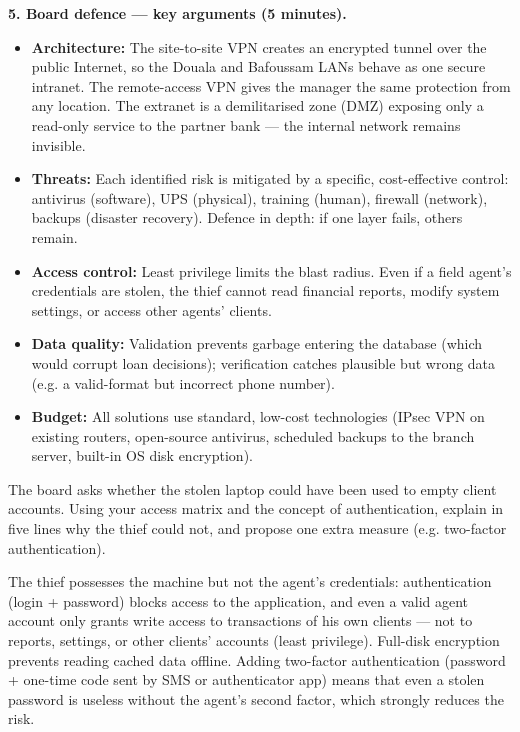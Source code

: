 \documentclass[11pt]{article}
\begin{document}
\textbf{5. Board defence — key arguments (5 minutes).}

\begin{itemize}
\item \textbf{Architecture:} The site-to-site VPN creates an encrypted tunnel over the public Internet, so the Douala and Bafoussam LANs behave as one secure intranet. The remote-access VPN gives the manager the same protection from any location. The extranet is a demilitarised zone (DMZ) exposing only a read-only service to the partner bank — the internal network remains invisible.
\item \textbf{Threats:} Each identified risk is mitigated by a specific, cost-effective control: antivirus (software), UPS (physical), training (human), firewall (network), backups (disaster recovery). Defence in depth: if one layer fails, others remain.
\item \textbf{Access control:} Least privilege limits the blast radius. Even if a field agent's credentials are stolen, the thief cannot read financial reports, modify system settings, or access other agents' clients.
\item \textbf{Data quality:} Validation prevents garbage entering the database (which would corrupt loan decisions); verification catches plausible but wrong data (e.g. a valid-format but incorrect phone number).
\item \textbf{Budget:} All solutions use standard, low-cost technologies (IPsec VPN on existing routers, open-source antivirus, scheduled backups to the branch server, built-in OS disk encryption).
\end{itemize}

\begin{exercice}[Extension]
The board asks whether the stolen laptop could have been used to empty client accounts. Using your access matrix and the concept of authentication, explain in five lines why the thief could not, and propose one extra measure (e.g. two-factor authentication).
\end{exercice}

\begin{corrige}
The thief possesses the machine but not the agent's credentials: authentication (login + password) blocks access to the application, and even a valid agent account only grants write access to transactions of his own clients — not to reports, settings, or other clients' accounts (least privilege). Full-disk encryption prevents reading cached data offline. Adding two-factor authentication (password + one-time code sent by SMS or authenticator app) means that even a stolen password is useless without the agent's second factor, which strongly reduces the risk.
\end{corrige}
\end{document}
